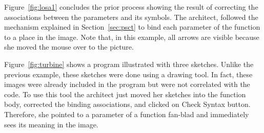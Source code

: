 Figure~\ref{fig:losa1} concludes the prior process showing the result of correcting the associations between the parameters and its symbols. The architect, followed the mechanism explained in Section~\ref{sec:psct} to bind each parameter of the function to a place in the image. Note that, in this example, all arrows are visible because she moved the mouse over to the picture.

Figure~\ref{fig:turbine} shows a program illustrated with three sketches. Unlike the previous example, these sketches were done using a drawing tool. In fact, these images were already included in the program but were not correlated with the code. To use this tool the architect just moved her sketches into the function body, corrected the binding associations, and clicked on Check Syntax button. Therefore, she pointed to a parameter of a function fan-blad and immediately sees its meaning in the image.

